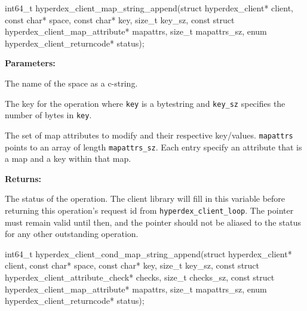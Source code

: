 \funcsep
\begin{ccode}
int64_t hyperdex_client_map_string_append(struct hyperdex_client* client,
                const char* space,
                const char* key, size_t key_sz,
                const struct hyperdex_client_map_attribute* mapattrs, size_t mapattrs_sz,
                enum hyperdex_client_returncode* status);
\end{ccode}
\funcdesc 

\noindent\textbf{Parameters:}
\begin{description}[labelindent=\widthof{{\texttt{mapattrs}, \texttt{mapattrs\_sz}}},leftmargin=*,noitemsep,nolistsep,align=right]
\item[\texttt{space}] The name of the space as a c-string.
\item[\texttt{key}, \texttt{key\_sz}] The key for the operation where \texttt{key} is a bytestring and \texttt{key\_sz} specifies the number of bytes in \texttt{key}.
\item[\texttt{mapattrs}, \texttt{mapattrs\_sz}] The set of map attributes to modify and their respective key/values.  \texttt{mapattrs} points to an array of length \texttt{mapattrs\_sz}.  Each entry specify an attribute that is a map and a key within that map.
\end{description}

\noindent\textbf{Returns:}
\begin{description}[labelindent=\widthof{{\texttt{status}}},leftmargin=*,noitemsep,nolistsep,align=right]
\item[\texttt{status}] The status of the operation.  The client library will fill in this variable before returning this operation's request id from \texttt{hyperdex\_client\_loop}.  The pointer must remain valid until then, and the pointer should not be aliased to the status for any other outstanding operation.
\end{description}

\funcsep
\begin{ccode}
int64_t hyperdex_client_cond_map_string_append(struct hyperdex_client* client,
                const char* space,
                const char* key, size_t key_sz,
                const struct hyperdex_client_attribute_check* checks, size_t checks_sz,
                const struct hyperdex_client_map_attribute* mapattrs, size_t mapattrs_sz,
                enum hyperdex_client_returncode* status);
\end{ccode}
\funcdesc 

